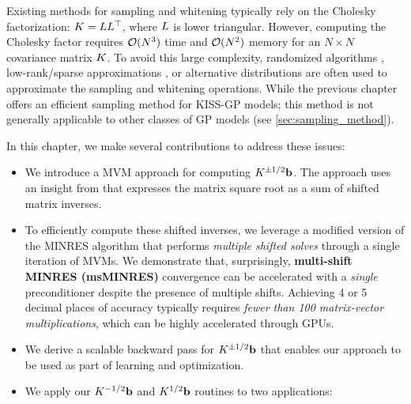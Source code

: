 Existing methods for sampling and whitening
typically rely on the Cholesky factorization: $K = L L^\top$, where $L$ is lower triangular.
However, computing the Cholesky factor requires $\bigo{N^3}$ time and $\bigo{N^2}$ memory for an $N \times N$ covariance matrix $K$.
To avoid this large complexity, randomized algorithms \cite{rahimi2008random,mutny2018efficient}, low-rank/sparse approximations \cite{hensman2017variational,wilson2020efficiently}, or alternative distributions \citep{wang2017max} are often used to approximate the sampling and whitening operations.
While the previous chapter offers an efficient sampling method for KISS-GP models; this method is not generally applicable to other classes of GP models (see \cref{sec:sampling_method}).

In this chapter, we make several contributions to address these issues:
%
\begin{itemize}
  \item We introduce a MVM approach for computing $K^{\pm 1 / 2} \mathbf{b}$.
    The approach uses an insight from \citet{hale2008computing} that expresses the matrix square root as a sum of shifted matrix inverses.

  \item To efficiently compute these shifted inverses, we leverage a modified version of the MINRES algorithm \cite{paige1975solution} that performs \emph{multiple shifted solves} through a single iteration of MVMs.
    We demonstrate that, surprisingly, {\bf multi-shift MINRES (msMINRES)} convergence can be accelerated with a \emph{single} preconditioner despite the presence of multiple shifts.
    Achieving 4 or 5 decimal places of accuracy typically requires \emph{fewer than 100 matrix-vector multiplications}, which can be highly accelerated through GPUs.

  \item We derive a scalable backward pass for $K^{\pm 1/2} \mathbf{b}$  that enables our approach to be used as part of learning and optimization.

  \item We apply our $K^{-1/2} \mathbf{b}$ and $K^{1/2} \mathbf{b}$ routines to two applications:
\end{itemize}
